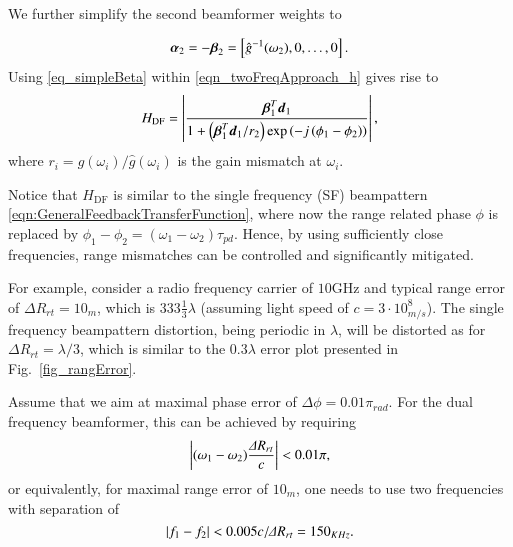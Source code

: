 We further simplify the second beamformer weights to 



\begin{equation}\label{eq_simpleBeta}
    \vAlpha_{2}=-\vBeta_{2}=\vBrace{\hat{g}^{-1}(\omega_2),0,\hdots,0}.
\end{equation}
Using \eqref{eq_simpleBeta} within  \eqref{eqn_twoFreqApproach_h} gives rise to 
\begin{equation}
    H_{\text{DF}} = \lBrace{\frac{\vBetaT_{1}\vd_{1}}{1+
    \rBrace{\vBetaT_{1}\vd_{1}/r_{2}}\exp\rBrace{-j\rBrace{\phi_{1}-\phi_{2}}}
    }},
    \label{eq_H_DF_general}
\end{equation}
where $r_i=g(\omega_i)/\hat{g}(\omega_i)$ is the gain mismatch at $\omega_i$. \par Notice that  $H_{\text{DF}}$ is similar to the single frequency (SF) beampattern \eqref{eqn:GeneralFeedbackTransferFunction}, where now the range related phase $\phi$ is replaced by $\phi_{1}-\phi_{2}=(\omega_1-\omega_2)\tau_{pd}$. Hence, by using sufficiently close frequencies, range mismatches can be controlled and significantly mitigated.
\par For example, consider a radio frequency carrier of $10\text{GHz}$ and typical range error of $\Delta{}R_{rt}=10_m$, which is $333\frac{1}{3}\lambda$ (assuming light speed of $c=3\cdot 10^{8}_{m/s}$). The single frequency beampattern distortion, being periodic in $\lambda$, will be distorted as for $\Delta{}R_{rt}=\lambda/3$, which is similar to the $0.3\lambda$ error plot presented in Fig.~\ref{fig_rangError}. 
\par Assume that we aim at maximal phase error of $\Delta \phi=0.01\pi_{rad}$. For the dual frequency beamformer, this can be achieved by requiring
\begin{equation}\label{eq_DF_phErr}
\abs{(\omega_1-\omega_2)\frac{\Delta{}R_{rt}}{c}}<0.01\pi,
\end{equation}
or equivalently, for maximal range error of $10_m$, one needs to use two frequencies with separation of
\[
\left\vert f_1-f_2\right\vert<0.005 c/\Delta{}R_{rt}=150_{KHz}. 
\]

